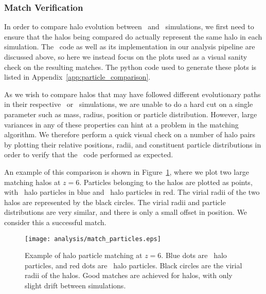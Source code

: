 \subsubsection{Match Verification}
\label{subsubsec:analysis--halo_comparison--match_verification}


In order to compare halo evolution between \lpt\ and \za\ simulations, we first need to ensure that the halos being compared do actually represent the same halo in each simulation.  The \crossmatch\ code as well as its implementation in our analysis pipeline are discussed above, so here we instead focus on the plots used as a visual sanity check on the resulting matches.  The python code used to generate these plots is listed in Appendix~\ref{app:particle_comparison}.

As we wish to compare halos that may have followed different evolutionary paths in their respective \lpt\ or \za\ simulations, we are unable to do a hard cut on a single parameter such as mass, radius, position or particle distribution.  However, large variances in any of these properties can hint at a problem in the matching algorithm.  We therefore perform a quick visual check on a number of halo pairs by plotting their relative positions, radii, and constituent particle distributions in order to verify that the \crossmatch\ code performed as expected.

An example of this comparison is shown in Figure~\ref{fig:match_verification}, where we plot two large matching halos at $z = 6$.  Particles belonging to the halos are plotted as points, with \lpt\ halo particles in blue and \za\ halo particles in red.  The virial radii of the two halos are represented by the black circles.  The virial radii and particle distributions are very similar, and there is only a small offset in position.  We consider this a successful match.

\begin{figure}[t]
	\centering
	\texttt{[image: analysis/match\_particles.eps]}
	\caption[Example of halo particle matching at $z = 6$.]{\footnotesize Example of halo particle matching at $z = 6$.  Blue dots are \lpt\ halo particles, and red dots are \za\ halo particles.  Black circles are the virial radii of the halos.  Good matches are achieved for halos, with only slight drift between simulations.}
	\label{fig:match_verification}
\end{figure}



